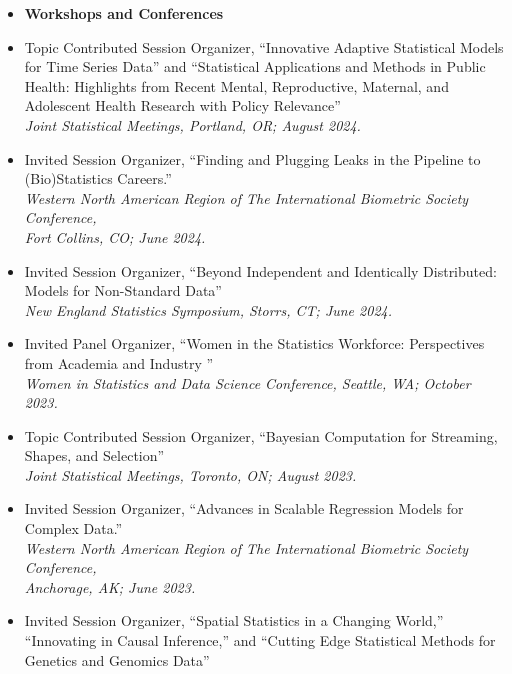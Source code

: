 \documentclass[11pt]{article}
\newcommand{\tab}{\hspace*{2em}}
\begin{document}
\begin{itemize} 
	\item[] \textbf{Workshops and Conferences}  \vspace{-2mm}
	\item[] Topic Contributed Session Organizer, ``Innovative Adaptive Statistical Models for Time Series Data'' and ``Statistical Applications and Methods in Public Health: Highlights from Recent Mental, Reproductive, Maternal, and Adolescent Health Research with Policy Relevance'' \hfill   \\
	\tab \emph{Joint Statistical Meetings, Portland, OR; August 2024.}  \vspace{-2mm}
	\item[] Invited Session Organizer, ``Finding and Plugging Leaks in the Pipeline to (Bio)Statistics Careers.'' \hfill   \\
	\tab \emph{Western North American Region of The International Biometric Society Conference,} \\
	\tab \emph{Fort Collins, CO; June 2024.}  \vspace{-2mm}
	\item[] Invited Session Organizer, ``Beyond Independent and Identically Distributed: Models for Non-Standard Data'' \hfill   \\
	\tab \emph{New England Statistics Symposium, Storrs, CT; June 2024.}  \vspace{-2mm}
	\item[] Invited Panel Organizer, ``Women in the Statistics Workforce: Perspectives from Academia and Industry
'' \hfill   \\
	\tab \emph{Women in Statistics and Data Science Conference, Seattle, WA; October 2023.}  \vspace{-2mm}
	\item[] Topic Contributed Session Organizer, ``Bayesian Computation for Streaming, Shapes, and Selection'' \hfill   \\
	\tab \emph{Joint Statistical Meetings, Toronto, ON; August 2023.}  \vspace{-2mm}
	\item[] Invited Session Organizer, ``Advances in Scalable Regression Models for Complex Data.'' \hfill   \\
	\tab \emph{Western North American Region of The International Biometric Society Conference,} \\
	\tab \emph{Anchorage, AK; June 2023.}  \vspace{-2mm}
	\item[] Invited Session Organizer, ``Spatial Statistics in a Changing World,'' ``Innovating in Causal Inference,'' and ``Cutting Edge Statistical Methods for Genetics and Genomics Data'' \hfill   \\

\end{itemize}
\end{document}
